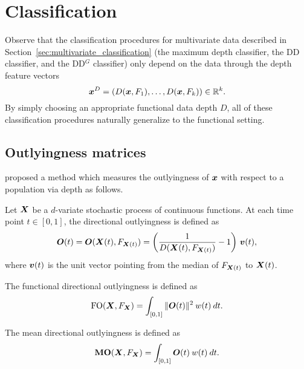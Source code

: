 \section{Classification}

Observe that the classification procedures for multivariate data described in
Section~\ref{sec:multivariate_classification} (the maximum depth classifier,
the DD classifier, and the DD$^G$ classifier) only depend on the data through
the depth feature vectors
\begin{equation}
    \bm{x}^D = (D(\bm{x}, F_1), \dots, D(\bm{x}, F_k)) \in \mathbb{R}^k.
\end{equation}
By simply choosing an appropriate functional data depth $D$, all of these
classification procedures naturally generalize to the functional setting.



\subsection{Outlyingness matrices}

\textcite{dai-genton-2018} proposed a method which measures the outlyingness
of $\bm{x}$ with respect to a population via depth as follows.

\begin{definition}
    Let $\bm{X}$ be a $d$-variate stochastic process of continuous functions.
    At each time point $t \in [0, 1]$, the directional outlyingness is defined
    as
    \begin{equation}
        \bm{O}(t) = \bm{O}(\bm{X}(t), F_{\bm{X}(t)}) = \left(\frac{1}{D(\bm{X}(t), F_{\bm{X}(t)})} - 1\right)\, \bm{v}(t),
    \end{equation}
    where $\bm{v}(t)$ is the unit vector pointing from the median of $F_{\bm{X}(t)}$
    to $\bm{X}(t)$.
\end{definition}

\begin{definition}
    The functional directional outlyingness is defined as
    \begin{equation}
        \operatorname{FO}(\bm{X}, F_{\bm{X}}) = \int_{[0, 1]} \Vert \bm{O}(t) \Vert^2 \:w(t)\:dt.
    \end{equation}
\end{definition}

\begin{definition}
    The mean directional outlyingness is defined as
    \begin{equation}
        \operatorname{\textbf{MO}}(\bm{X}, F_{\bm{X}}) = \int_{[0, 1]} \bm{O}(t) \:w(t)\:dt.
    \end{equation}
\end{definition}

